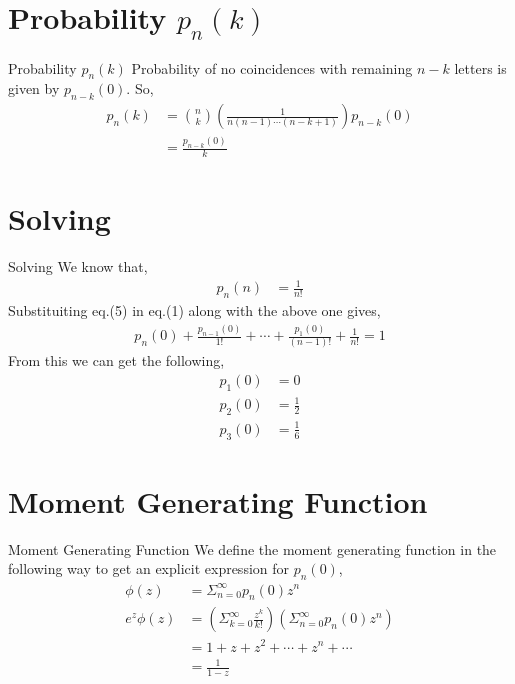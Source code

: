 \documentclass{beamer}
\providecommand{\brak}[1]{\ensuremath{\left(#1\right)}}
\begin{document}
\section{Probability $p_n(k)$}
\begin{frame}{Probability $p_n(k)$}
Probability of no coincidences with remaining $n-k$ letters is given by $p_{n-k}(0)$.
	So,
	\begin{align}
	 p_n(k) &= {n \choose k}\brak{\frac{1}{n(n-1)\cdots(n-k+1)}}p_{n-k}(0) \\
	 &= \frac{p_{n-k}(0)}{k\!}
	\end{align}
\end{frame}


\section{Solving}
\begin{frame}{Solving}
We know that,
	\begin{align}
	           p_n(n) &= \frac{1}{n!}
	\end{align}
	Substituiting eq.(5) in eq.(1) along with the above one gives,
	\begin{align}
	 & p_n(0)+\frac{p_{n-1}(0)}{1!}+\cdots+\frac{p_{1}(0)}{(n-1)!}+\frac{1}{n!} = 1 &
	\end{align}
	From this we can get the following,
	\begin{align}
	          p_1(0) &= 0 \\
	          p_2(0) &= \frac{1}{2} \\
	          p_3(0) &= \frac{1}{6}
	\end{align}
\end{frame}


\section{Moment Generating Function}
\begin{frame}{Moment Generating Function}
We define the moment generating function in the following way to get an explicit expression for $p_n(0)$,
	\begin{align}
	         \phi(z) &= \Sigma^\infty_{n=0}p_n(0)z^n \\
	         e^z\phi(z) &= \brak{\Sigma^\infty_{k=0}\frac{z^k}{k!}}\brak{\Sigma^\infty_{n=0}p_n(0)z^n} \\
	         &= 1+z+z^2+\cdots+z^n+\cdots \\
	         &= \frac{1}{1-z}
	\end{align}
\end{frame}
\end{document}
